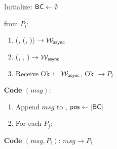 \begin{bbox}[title={$\mathcal{F}_\msf{Atomic}$}]

Initialize: ${\mathsf {BC}} \leftarrow \emptyset$

\OnInput {} from $P_i$:
	\begin{enumerate}
		\item \Send (\Leak, (, \Partyi)) $\rightarrow \mathcal{W}_{{\mathsf {async}}}$

		\item \Send (\Schedule, , ) $\rightarrow \mathcal{W}_{{\mathsf {async}}}$

		\item Receive Ok $\leftarrow \mathcal{W}_{{\mathsf {async}}}$, \Send Ok $\rightarrow P_i$

	\end{enumerate}
   
{\color{Blue} {\bf Code}  $(msg)$:}

	\begin{enumerate}
		\item {\color{Blue} Append $msg$ to , ${\mathsf {pos}} \leftarrow |{\mathsf {BC}}|$}

		\item {\color{Blue} For each $P_j$:}


		
    \end{enumerate}

{\color{Red} {\bf Code}  $(msg, P_i)$: \Send $msg \rightarrow P_i$ }


\end{bbox}
